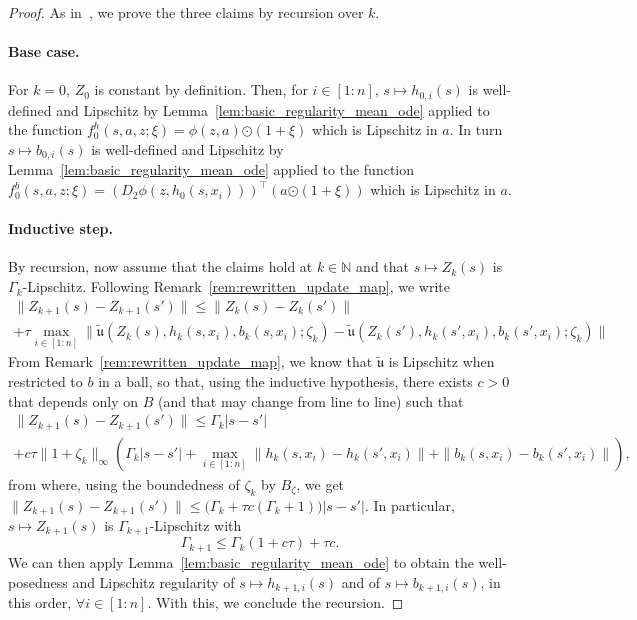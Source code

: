 \documentclass[a4paper,11pt]{article}
\newcommand{\1}{\mathbbm{1}}
\theoremstyle{definition}
\theoremstyle{remark}
\begin{document}
\begin{proof}
As in~\cite[Lemma 5.2]{chizat2025hidden}, we prove the three claims by recursion over $k$. 

\paragraph{Base case.} For $k = 0$, $Z_0$ is constant by definition. Then, for $i \in [1:n]$, $s \mapsto h_{0,i}(s)$ is well-defined and Lipschitz by Lemma~\ref{lem:basic_regularity_mean_ode} applied to the function $f_0^h(s,a,z{;\xi}) = \phi(z,a){\odot(1+\xi)}$ which is Lipschitz in $a$. In turn $s \mapsto b_{0,i}(s)$ is well-defined and Lipschitz by Lemma~\ref{lem:basic_regularity_mean_ode} applied to the function $f_0^b(s,a,z{;\xi}) = (D_2\phi(z,h_0(s, x_i)))^\top(a{\odot(1+\xi)})$ which is Lipschitz in $a$.

\paragraph{Inductive step.} By recursion, now assume that the claims hold at $k \in \mathbb{N}$ and that $s \mapsto Z_k(s)$ is $\Gamma_k$-Lipschitz. 
Following Remark~\ref{rem:rewritten_update_map}, we write
\begin{multline*}
    \|Z_{k+1}(s) - Z_{k+1}(s')\| \leq \|Z_k(s) - Z_k(s')\| \\+ \tau \max_{i \in [1:n]} \|\tilde{\mathfrak{u}}(Z_k(s), h_k(s, x_i), b_k(s, x_i){; \zeta_k}) - \tilde{\mathfrak{u}}(Z_k(s'), h_k(s', x_i), b_k(s', x_i){; \zeta_k})\|
\end{multline*}
{From Remark~\ref{rem:rewritten_update_map}, we know that $\tilde{\mathfrak{u}}$ is Lipschitz when restricted to $b$ in a ball, so that, using the inductive hypothesis, there exists $c > 0$ that depends only on $B$ (and that may change from line to line) such that}
\begin{multline*}
    {\|Z_{k+1}(s) - Z_{k+1}(s')\| \leq \Gamma_k|s-s'|} \\{+ c\tau\|1+\zeta_k\|_\infty (\Gamma_k|s-s'| + \max_{i \in [1:n]} \|h_k(s, x_i) - h_k(s', x_i)\| + \|b_k(s, x_i) - b_k(s', x_i)\|),}
\end{multline*}
{from where, using the boundedness of $\zeta_k$ by $B_\zeta$, we get
\(\|Z_{k+1}(s) - Z_{k+1}(s')\| \leq \Big(\Gamma_k + \tau c(\Gamma_k + 1)\Big) |s - s'|\).}
In particular, $s \mapsto Z_{k+1}(s)$ is $\Gamma_{k+1}$-Lipschitz with 
\[\Gamma_{k+1} \leq \Gamma_k(1 + c\tau) + \tau c.\] We can then apply Lemma~\ref{lem:basic_regularity_mean_ode} to obtain the well-posedness and Lipschitz regularity 
of $s \mapsto h_{k+1,i}(s)$ and of $s \mapsto b_{k+1,i}(s)$, in this order, $\forall i \in [1:n]$. With this, we conclude the recursion. 


\end{proof}
\end{document}
